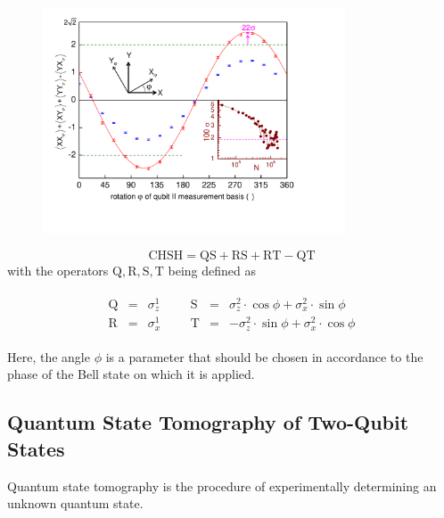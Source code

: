 \begin{figure}
	\centering
		\includegraphics[width=0.8\textwidth]{./material/papers/iswap/figures/chsh}
	\label{fig:CHSH}
	\caption{}
\end{figure}

\begin{equation}
\mathrm{CHSH} = \mathrm{QS}+\mathrm{RS}+\mathrm{RT}-\mathrm{QT}
\end{equation}
with the operators $\mathrm{Q,R,S,T}$ being defined as

\begin{eqnarray}
	\begin{array}{cccccccc}
		\mathrm{Q} & = & \sigma_z^1 &&& \mathrm{S} & = & \sigma_z^2\cdot \cos{\phi}+\sigma_x^2 \cdot \sin{\phi} \\
		\mathrm{R} & = & \sigma_x^1 &&& \mathrm{T} & = & -\sigma_z^2\cdot \sin{\phi}+\sigma_x^2 \cdot \cos{\phi}
	\end{array}
\end{eqnarray} 

Here, the angle $\phi$ is a parameter that should be chosen in accordance to the phase of the Bell state on which it is applied.

\subsection{Quantum State Tomography of Two-Qubit States}

Quantum state tomography is the procedure of experimentally determining an unknown quantum state\citep{michael_a._nielsen_quantum_2000}.

